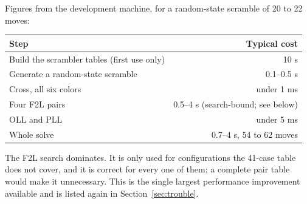 Figures from the development machine, for a random-state scramble of 20 to 22 moves:

\begin{center}
\begin{tabular}{@{}lr@{}}
\toprule
Step & Typical cost \\
\midrule
Build the scrambler tables (first use only) & 10 s \\
Generate a random-state scramble & 0.1--0.5 s \\
Cross, all six colors & under 1 ms \\
Four F2L pairs & 0.5--4 s (search-bound; see below) \\
OLL and PLL & under 5 ms \\
Whole solve & 0.7--4 s, 54 to 62 moves \\
\bottomrule
\end{tabular}
\end{center}

The F2L search dominates.  It is only used for configurations the 41-case table does
not cover, and it is correct for every one of them; a complete pair table would make
it unnecessary.  This is the single largest performance improvement available and is
listed again in Section~\ref{sec:trouble}.
